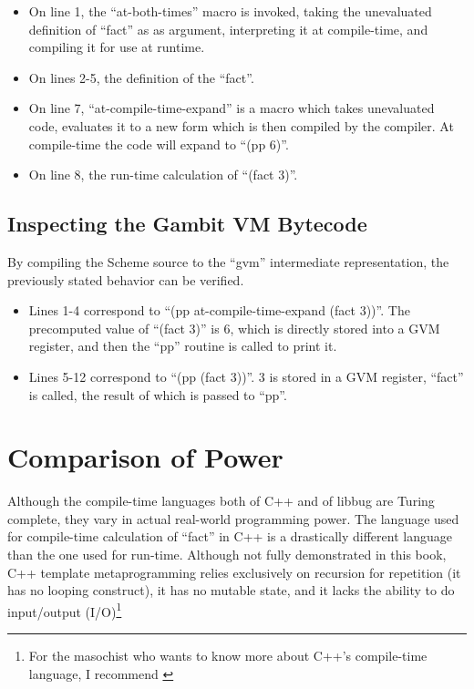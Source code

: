  \begin{itemize}
   \item
      On line 1, the ``at-both-times'' macro is invoked, taking the unevaluated
      definition of ``fact'' as
      as argument, interpreting it at compile-time, and compiling it for use at runtime.
   \item
      On lines 2-5, the definition of the ``fact''.
   \item
      On line 7, ``at-compile-time-expand'' is a macro which takes unevaluated code,
      evaluates it to a new form which is then compiled by the compiler.  At compile-time the code
      will expand to ``(pp 6)''.
   \item
      On line 8, the run-time calculation of ``(fact 3)''.
 \end{itemize}

 \subsection{Inspecting the Gambit VM Bytecode}
 By compiling the Scheme source to the ``gvm'' intermediate
 representation, the previously stated behavior can be verified.


 \begin{itemize}
   \item
      Lines 1-4 correspond to ``(pp {at-compile-time-expand (fact 3)})''.  The precomputed
      value of ``(fact 3)'' is 6, which is directly stored into a GVM register, and
      then the ``pp'' routine is called to print it.
   \item
      Lines 5-12 correspond to ``(pp (fact 3))''.  3 is stored in a GVM register, ``fact''
      is called, the result of which is passed to ``pp''.
 \end{itemize}

 \section{Comparison of Power}

 Although the compile-time languages both of C++ and of libbug are Turing complete,
 they vary in actual real-world programming power.  The language used
 for compile-time calculation of ``fact'' in C++ is a drastically different language than
 the one used for run-time.  Although not fully demonstrated in this book,
 C++ template metaprogramming relies exclusively on recursion for repetition (it has no
 looping construct), it has no mutable state, and it lacks the ability to do input/output
 (I/O)\footnote{For the masochist who wants to know more about C++'s compile-time language,
 I recommend \cite{ctm} }

